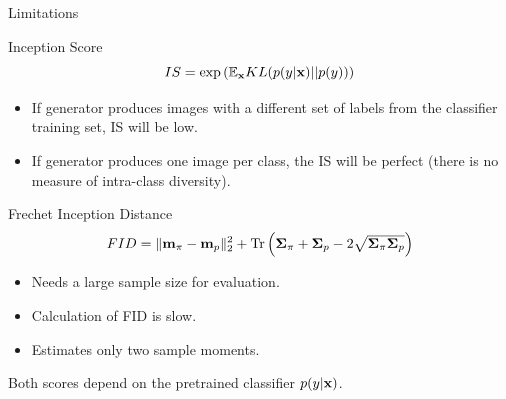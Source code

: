 \begin{frame}{Limitations}
	\vspace{-0.5cm}
	\begin{block}{Inception Score}
		\vspace{-0.5cm}
		\[
			IS =  \exp \left( \mathbb{E}_{\mathbf{x}} KL(p(y | \mathbf{x}) || p(y)) \right)
		\]
		\vspace{-0.7cm}
	\end{block}
	\begin{itemize}
		\item If generator produces images with a different set of labels from the classifier training set, IS will be low.
		\item If generator produces one image per class, the IS will be perfect (there is no measure of intra-class diversity).
	\end{itemize}
	\begin{block}{Frechet Inception Distance}
		\vspace{-0.4cm}
		\[
			FID = \| \mathbf{m}_{\pi} - \mathbf{m}_{p}\|_2^2 + \text{Tr} \left( \boldsymbol{\Sigma}_{\pi} + \boldsymbol{\Sigma}_p - 2 \sqrt{\boldsymbol{\Sigma}_{\pi} \boldsymbol{\Sigma}_p} \right)
		\]
		\vspace{-0.7cm}
	\end{block}
	\begin{itemize}
		\item Needs a large sample size for evaluation.
		\item Calculation of FID is slow.
		\item Estimates only two sample moments.
	\end{itemize}
	Both scores depend on the pretrained classifier $p(y | \mathbf{x})$.

\end{frame}
